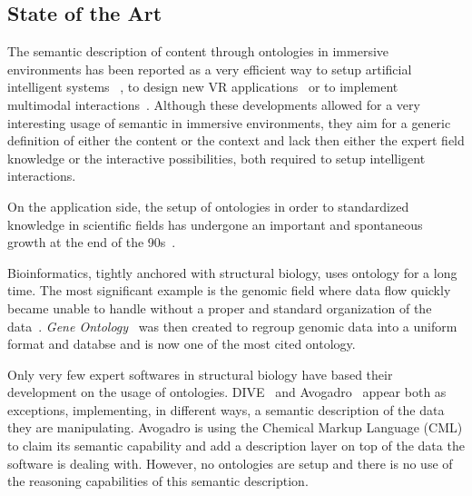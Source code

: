 \documentclass{vgtc}                          %
\begin{document}
\subsection{State of the Art}

The semantic description of content through ontologies in immersive environments has been reported as a very efficient way to setup artificial intelligent systems ~\cite{Wiebusch:2015aa}, to design new VR applications~\cite{kleinermann2005designing} or to implement multimodal interactions~\cite{irawati2005semantic}. Although these developments allowed for a very interesting usage of semantic in immersive environments, they aim for a generic definition of either the content or the context and lack then either the expert field knowledge or the interactive possibilities, both required to setup intelligent interactions.

On the application side, the setup of ontologies in order to standardized knowledge in scientific fields has undergone an important and spontaneous growth at the end of the 90s~\cite{schulze-kremer_ontologies_2002}.

Bioinformatics, tightly anchored with structural biology, uses ontology for a long time. The most significant example is the genomic field where data flow quickly became unable to handle without a proper and standard organization of the data~\cite{schuurman_ontologies_2008}. \textit{Gene Ontology}~\cite{ashburner_gene_2000} was then created to regroup genomic data into a uniform format and databse and is now one of the most cited ontology. 

Only very few expert softwares in structural biology have based their development on the usage of ontologies. DIVE~\cite{rysavy_dive:_2014} and Avogadro~\cite{hanwell2012avogadro} appear both as exceptions, implementing, in different ways, a semantic description of the data they are manipulating. Avogadro is using the Chemical Markup Language (CML) to claim its semantic capability and add a description layer on top of the data the software is dealing with. However, no ontologies are setup and there is no use of the reasoning capabilities of this semantic description. 
\end{document}
